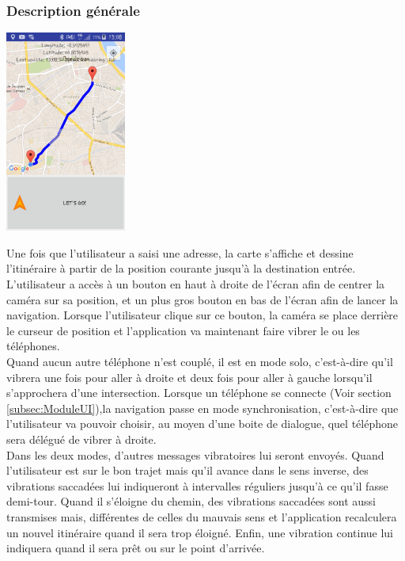 \subsubsection{Description générale}

\begin{center}
\includegraphics[height=250px]{Assets/screenMap.png}
\label{screenMap}
\end{center}

Une fois que l'utilisateur a saisi une adresse, la carte s'affiche et dessine l'itinéraire à partir de la position courante jusqu'à la destination entrée. L'utilisateur a accès à un bouton en haut à droite de l'écran afin de centrer la caméra sur sa position, et un plus gros bouton en bas de l'écran afin de lancer la navigation. Lorsque l'utilisateur clique sur ce bouton, la caméra se place derrière le curseur de position et l'application va maintenant faire vibrer le ou les téléphones.\\
Quand aucun autre téléphone n'est couplé, il est en mode solo, c'est-à-dire qu'il vibrera une fois pour aller à droite et deux fois pour aller à gauche lorsqu'il s'approchera d'une intersection. Lorsque un téléphone se connecte (Voir section \ref{subsec:ModuleUI}),la navigation passe en mode synchronisation, c'est-à-dire que l'utilisateur va pouvoir choisir, au moyen d'une boite de dialogue, quel téléphone sera délégué de vibrer à droite. \\Dans les deux modes, d'autres messages vibratoires lui seront envoyés. Quand l'utilisateur est sur le bon trajet mais qu'il avance dans le sens inverse, des vibrations saccadées lui indiqueront à intervalles réguliers jusqu'à ce qu'il fasse demi-tour. Quand il s'éloigne du chemin, des vibrations saccadées sont aussi transmises mais, différentes de celles du mauvais sens et l'application recalculera un nouvel itinéraire quand il sera trop éloigné. Enfin, une vibration continue lui indiquera quand il sera prêt ou sur le point d'arrivée. 

